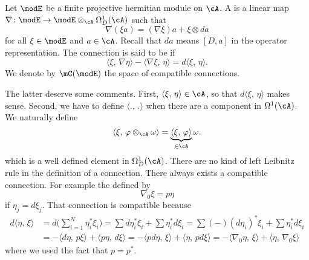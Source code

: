 \begin{definition}
Let $\modE$ be a finite projective hermitian module on $\cA$. A  is a linear map $\nabla\colon \modE\to \modE\otimes_{\cA}\Omega^1_D(\cA)$ such that
\begin{equation}
\nabla(\xi a)=(\nabla\xi)a+\xi\otimes da
\end{equation}
for all $\xi\in\modE$ and $a\in\cA$. Recall that $da$ means $[D,a]$ in the operator representation. The connection is said to be  if
\begin{equation}
 \langle \xi,\,\nabla\eta\rangle-\langle \nabla\xi,\,\eta\rangle=d\langle \xi,\,\eta\rangle.
\end{equation}
We denote by $\mC(\modE)$ the space of compatible connections.

\end{definition}
The latter deserve some comments. First, $\langle \xi,\,\eta\rangle\in\cA$, so that $d\langle \xi,\,\eta\rangle$ makes sense. Second, we have to define $\langle .,\,.\rangle$ when there are a component in $\Omega^1(\cA)$. We naturally define
\[ 
  \langle \xi,\,\varphi\otimes_{\cA}\omega\rangle=\underbrace{\langle \xi,\, \varphi\rangle}_{\in\cA}\omega.
\]
which is a well defined element in $\Omega^1_D(\cA)$. There are no kind of left Leibnitz rule in the definition of a connection. There always exists a compatible connection. For example the  defined by
\begin{equation}
\nabla_0\xi=p\eta
\end{equation}
if $\eta_j=d\xi_j$. That connection is compatible because
\begin{equation}
\begin{split}
  d\langle \eta,\,\xi\rangle&=d\big( \sum_{i=1}^{N}\eta_i^*\xi_i \big)=\sum d\eta_i^*\xi_i+\sum \eta_i^*d\xi_i
		=\sum (-)(d\eta_i)^*\xi_i+\sum \eta_i^*d\xi_i\\
		&=-\langle d\eta,\,p\xi\rangle+\langle p\eta,\,d\xi\rangle=-\langle pd\eta,\,\xi\rangle+\langle  \eta,\,pd\xi\rangle
	=-\langle \nabla_0\eta,\,\xi\rangle+\langle \eta,\,\nabla_0\xi\rangle
\end{split}
\end{equation}
where we used the fact that $p=p^*$.


